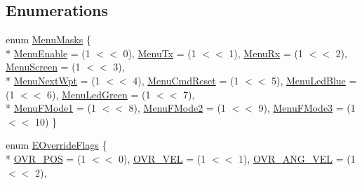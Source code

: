 \subsection*{Enumerations}
\begin{DoxyCompactItemize}
\item 
enum \hyperlink{group___aero_sim_r_c_ga32699aad93298e22cc4b036b666b286c}{Menu\-Masks} \{ \\*
\hyperlink{group___aero_sim_r_c_gga32699aad93298e22cc4b036b666b286cab50d95f3a435766fe9b26f5e29268192}{Menu\-Enable} = (1 $<$$<$ 0), 
\hyperlink{group___aero_sim_r_c_gga32699aad93298e22cc4b036b666b286cac65bf61777efbb25c693c61e1e15f8ee}{Menu\-Tx} = (1 $<$$<$ 1), 
\hyperlink{group___aero_sim_r_c_gga32699aad93298e22cc4b036b666b286cab104e61c43e82a883282864db332faa7}{Menu\-Rx} = (1 $<$$<$ 2), 
\hyperlink{group___aero_sim_r_c_gga32699aad93298e22cc4b036b666b286ca5acf4fd0f1095d55cf5ef95ba9e1d343}{Menu\-Screen} = (1 $<$$<$ 3), 
\\*
\hyperlink{group___aero_sim_r_c_gga32699aad93298e22cc4b036b666b286ca1d4c50f87301f42f7115d64f05898796}{Menu\-Next\-Wpt} = (1 $<$$<$ 4), 
\hyperlink{group___aero_sim_r_c_gga32699aad93298e22cc4b036b666b286cabaf0d1cc3d420c7d4ce1a24b24982d0b}{Menu\-Cmd\-Reset} = (1 $<$$<$ 5), 
\hyperlink{group___aero_sim_r_c_gga32699aad93298e22cc4b036b666b286cac209851ef711b8f020b765b06235e03b}{Menu\-Led\-Blue} = (1 $<$$<$ 6), 
\hyperlink{group___aero_sim_r_c_gga32699aad93298e22cc4b036b666b286ca8ec14791dc6d73e7371546dff18d3503}{Menu\-Led\-Green} = (1 $<$$<$ 7), 
\\*
\hyperlink{group___aero_sim_r_c_gga32699aad93298e22cc4b036b666b286caec0a3149d458625f8fd926cabbdc458d}{Menu\-F\-Mode1} = (1 $<$$<$ 8), 
\hyperlink{group___aero_sim_r_c_gga32699aad93298e22cc4b036b666b286ca31275b1f310192cb75efe8917e7b9062}{Menu\-F\-Mode2} = (1 $<$$<$ 9), 
\hyperlink{group___aero_sim_r_c_gga32699aad93298e22cc4b036b666b286caf0bec956817a01c8b03b2c1f7ddcdde5}{Menu\-F\-Mode3} = (1 $<$$<$ 10)
 \}
\item 
enum \hyperlink{group___aero_sim_r_c_ga98eae8f226a6c44ff070e68cbc49f757}{E\-Override\-Flags} \{ \\*
\hyperlink{group___aero_sim_r_c_gga98eae8f226a6c44ff070e68cbc49f757ac5b5b2cf4c10db1a69b11b0cc410f0c3}{O\-V\-R\-\_\-\-P\-O\-S} = (1 $<$$<$ 0), 
\hyperlink{group___aero_sim_r_c_gga98eae8f226a6c44ff070e68cbc49f757a2b201eb2961652842393f14a97f20dea}{O\-V\-R\-\_\-\-V\-E\-L} = (1 $<$$<$ 1), 
\hyperlink{group___aero_sim_r_c_gga98eae8f226a6c44ff070e68cbc49f757aeca82b94cbac4c94431e590f9c4bf98f}{O\-V\-R\-\_\-\-A\-N\-G\-\_\-\-V\-E\-L} = (1 $<$$<$ 2), 

\end{DoxyCompactItemize}
